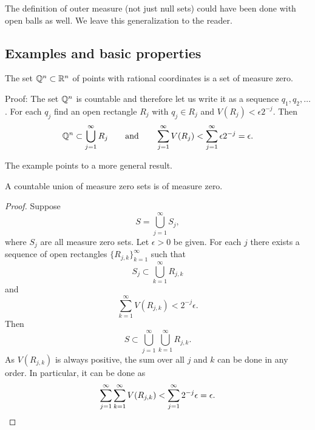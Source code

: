 The definition of outer measure (not just null sets)
could have been done with open balls
as well.  We leave this generalization to the reader.

\subsection{Examples and basic properties}

\begin{example}
The set ${\mathbb{Q}}^n \subset {\mathbb{R}}^n$ of points with rational coordinates
is a set of measure zero.

Proof:
The set ${\mathbb{Q}}^n$ is countable and therefore let us write it
as a sequence $q_1,q_2,\ldots$.  For each $q_j$ find an open rectangle
$R_j$ with $q_j \in R_j$ and $V(R_j) < \epsilon 2^{-j}$.  Then
\begin{equation*}
{\mathbb{Q}}^n \subset \bigcup_{j=1}^\infty R_j \qquad \text{and} \qquad
\sum_{j=1}^\infty V(R_j) <
\sum_{j=1}^\infty \epsilon 2^{-j} = \epsilon .
\end{equation*}
\end{example}

The example points to a more general result.

\begin{prop}
A countable union of measure zero sets is of measure zero.
\end{prop}

\begin{proof}
Suppose
\begin{equation*}
S = \bigcup_{j=1}^\infty S_j ,
\end{equation*}
where $S_j$ are all measure zero sets.  Let $\epsilon > 0$ be given.
For each $j$
there exists a sequence of open rectangles $\{ R_{j,k} \}_{k=1}^\infty$
such that
\begin{equation*}
S_j \subset \bigcup_{k=1}^\infty R_{j,k}
\end{equation*}
and 
\begin{equation*}
\sum_{k=1}^\infty V(R_{j,k}) < 2^{-j} \epsilon .
\end{equation*}
Then
\begin{equation*}
S \subset \bigcup_{j=1}^\infty \bigcup_{k=1}^\infty R_{j,k} .
\end{equation*}
As $V(R_{j,k})$ is always positive, the sum over all $j$ and $k$
can be done in any order.  In particular, it can be done as
\begin{equation*}
\sum_{j=1}^\infty \sum_{k=1}^\infty V(R_{j,k}) <
\sum_{j=1}^\infty 2^{-j} \epsilon = \epsilon . \qedhere
\end{equation*}
\end{proof}

